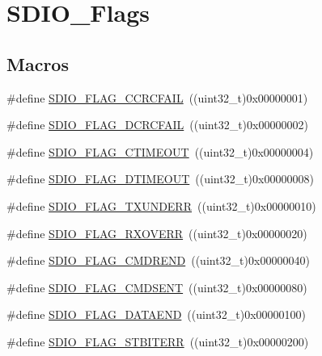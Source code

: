 \hypertarget{group___s_d_i_o___flags}{}\section{S\+D\+I\+O\+\_\+\+Flags}
\label{group___s_d_i_o___flags}
\subsection*{Macros}
\begin{DoxyCompactItemize}
\item 
\#define \mbox{\hyperlink{group___s_d_i_o___flags_ga8ff1f3960378e05ec3c949940e1c49d0}{S\+D\+I\+O\+\_\+\+F\+L\+A\+G\+\_\+\+C\+C\+R\+C\+F\+A\+IL}}~((uint32\+\_\+t)0x00000001)
\item 
\#define \mbox{\hyperlink{group___s_d_i_o___flags_ga6de936ea11cbc79444d519268ad9f9bd}{S\+D\+I\+O\+\_\+\+F\+L\+A\+G\+\_\+\+D\+C\+R\+C\+F\+A\+IL}}~((uint32\+\_\+t)0x00000002)
\item 
\#define \mbox{\hyperlink{group___s_d_i_o___flags_ga7389f64ff6cfa4f459bf852b5faede30}{S\+D\+I\+O\+\_\+\+F\+L\+A\+G\+\_\+\+C\+T\+I\+M\+E\+O\+UT}}~((uint32\+\_\+t)0x00000004)
\item 
\#define \mbox{\hyperlink{group___s_d_i_o___flags_ga2d2fd219dd9fea522862195ab9568345}{S\+D\+I\+O\+\_\+\+F\+L\+A\+G\+\_\+\+D\+T\+I\+M\+E\+O\+UT}}~((uint32\+\_\+t)0x00000008)
\item 
\#define \mbox{\hyperlink{group___s_d_i_o___flags_gabd18f8e5d5387a38dccbe1bf28ae5dbc}{S\+D\+I\+O\+\_\+\+F\+L\+A\+G\+\_\+\+T\+X\+U\+N\+D\+E\+RR}}~((uint32\+\_\+t)0x00000010)
\item 
\#define \mbox{\hyperlink{group___s_d_i_o___flags_gad49d60039e40d31b734cfacf90caa84f}{S\+D\+I\+O\+\_\+\+F\+L\+A\+G\+\_\+\+R\+X\+O\+V\+E\+RR}}~((uint32\+\_\+t)0x00000020)
\item 
\#define \mbox{\hyperlink{group___s_d_i_o___flags_ga083531db75a1e4c05c47578763d53af1}{S\+D\+I\+O\+\_\+\+F\+L\+A\+G\+\_\+\+C\+M\+D\+R\+E\+ND}}~((uint32\+\_\+t)0x00000040)
\item 
\#define \mbox{\hyperlink{group___s_d_i_o___flags_gac81f3837aac17a6aed7310a8ea460f17}{S\+D\+I\+O\+\_\+\+F\+L\+A\+G\+\_\+\+C\+M\+D\+S\+E\+NT}}~((uint32\+\_\+t)0x00000080)
\item 
\#define \mbox{\hyperlink{group___s_d_i_o___flags_gaaacb2f6207c149e05f8bdd70e5d49926}{S\+D\+I\+O\+\_\+\+F\+L\+A\+G\+\_\+\+D\+A\+T\+A\+E\+ND}}~((uint32\+\_\+t)0x00000100)
\item 
\#define \mbox{\hyperlink{group___s_d_i_o___flags_gae83f7cb3fa1183898131f3de47c2333e}{S\+D\+I\+O\+\_\+\+F\+L\+A\+G\+\_\+\+S\+T\+B\+I\+T\+E\+RR}}~((uint32\+\_\+t)0x00000200)

\end{DoxyCompactItemize}
